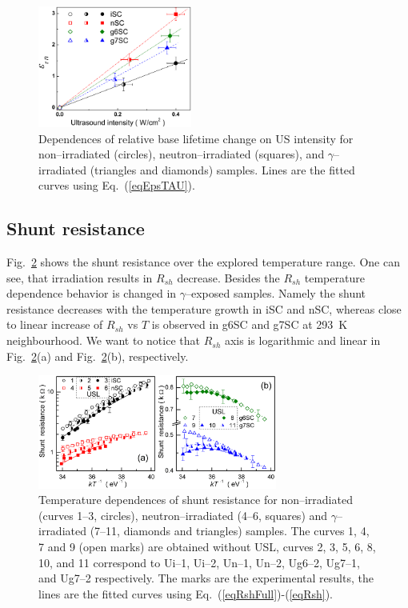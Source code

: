 \documentclass[aip,jap, amsmath,amssymb,reprint]{revtex4-1}
\begin{document}
\begin{figure}
\includegraphics[width=0.45\textwidth]{olikhFig7}%
\caption{\label{fig_Kus}
Dependences of relative base lifetime change on US intensity for non--irradiated (circles), neutron--irradiated (squares), and $\gamma$--irradiated
(triangles and diamonds) samples.
Lines are the fitted curves using Eq.~(\ref{eqEpsTAU}).
}%
\end{figure}

\subsection{Shunt resistance\label{Rsh}}
Fig.~\ref{fig_Rsh} shows the  shunt resistance  over the explored temperature range.
One can see, that irradiation results in $R_{sh}$ decrease.
Besides the $R_{sh}$ temperature dependence behavior is changed in $\gamma$--exposed samples.
Namely the shunt resistance decreases with the temperature growth in iSC and nSC,
whereas close to linear increase of $R_{sh}$ vs $T$  is observed in g6SC and g7SC at 293~K neighbourhood.
We want to notice that $R_{sh}$ axis is logarithmic and linear in Fig.~\ref{fig_Rsh}(a) and Fig.~\ref{fig_Rsh}(b), respectively.

\begin{figure}
\includegraphics[width=0.7\textwidth]{olikhFig8}%
\caption{\label{fig_Rsh}
Temperature dependences of shunt resistance for non--irradiated (curves 1--3, circles),
neutron--irradiated (4--6, squares) and $\gamma$--irradiated (7--11, diamonds and triangles) samples.
The curves 1, 4, 7 and 9 (open marks) are obtained without USL,
curves 2, 3, 5, 6, 8, 10, and 11 correspond to
Ui--1, Ui--2, Un--1, Un--2, Ug6--2, Ug7--1, and Ug7--2 respectively.
The marks are the experimental results, the lines are the fitted curves using Eq.~(\ref{eqRshFull})-(\ref{eqRsh}).
}%
\end{figure}
\end{document}

